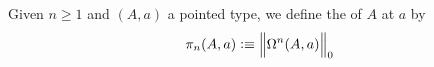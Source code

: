\documentclass[hott-all.tex]{subfiles}
\begin{document}
%
% 
\begin{defn}
  Given $n\ge 1$ and $(A,a)$ a pointed type, we define the  of $A$
  at $a$ by
  \[\pi_n(A,a)\defeq \Trunc0{\Omega^n(A,a)}\]
\end{defn}
% 
% 
\end{document}
